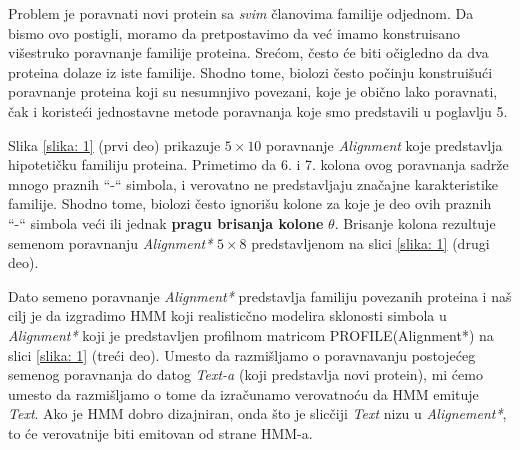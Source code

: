 Problem je poravnati novi protein sa \textit{svim} članovima familije odjednom. Da bismo ovo postigli, moramo da pretpostavimo da već imamo konstruisano višestruko poravnanje familije proteina. Srećom, često će biti očigledno da dva proteina dolaze iz iste familije. Shodno tome, biolozi često počinju konstruišući poravnanje proteina koji su nesumnjivo povezani, koje je obično lako poravnati, čak i koristeći jednostavne metode poravnanja koje smo predstavili u poglavlju 5.

Slika \ref{slika: 1} (prvi deo) prikazuje $5 \times 10$ poravnanje \textit{Alignment} koje predstavlja hipotetičku familiju proteina. Primetimo da 6. i 7. kolona ovog poravnanja sadrže mnogo praznih ``-`` simbola, i verovatno ne predstavljaju značajne karakteristike familije. Shodno tome, biolozi često ignorišu kolone za koje je deo ovih praznih ``-`` simbola veći ili jednak \textbf{pragu brisanja kolone} $\theta$. Brisanje kolona rezultuje semenom poravnanju \textit{Alignment*} $5 \times 8$ predstavljenom na slici \ref{slika: 1} (drugi deo).

Dato semeno poravnanje \textit{Alignment*} predstavlja familiju povezanih proteina i naš cilj je da izgradimo HMM koji realisticčno modelira sklonosti simbola u \textit{Alignment*} koji je predstavljen profilnom matricom PROFILE(Alignment*) na slici \ref{slika: 1} (treći deo). Umesto da razmišljamo o poravnavanju postojećeg  semenog poravnanja do datog \textit{Text-a} (koji predstavlja novi protein), mi ćemo umesto da razmišljamo o tome da izračunamo verovatnoću da HMM emituje \textit{Text}. Ako je HMM dobro dizajniran, onda što je slicčiji \textit{Text} nizu u \textit{Alignement*}, to će verovatnije biti emitovan od strane HMM-a.


